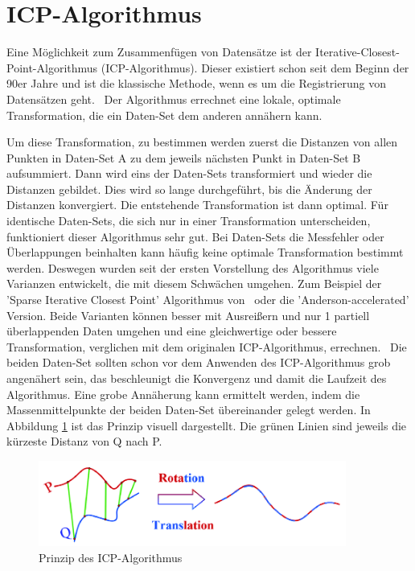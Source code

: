 \section{ICP-Algorithmus} \label{icp}

Eine Möglichkeit zum Zusammenfügen von Datensätze ist der 
Iterative-Closest-Point-Algorithmus (ICP-Algorithmus).
Dieser existiert schon seit dem Beginn der 90er Jahre und ist 
die klassische Methode, wenn es um die Registrierung von Datensätzen geht.~\cite{icp}
Der Algorithmus errechnet eine lokale, optimale Transformation, die ein Daten-Set
dem anderen annähern kann. \cite{icp_og}

Um diese Transformation, zu bestimmen werden zuerst die Distanzen von allen 
Punkten in Daten-Set A zu dem jeweils nächsten Punkt in Daten-Set B aufsummiert. 
Dann wird eins der Daten-Sets transformiert und wieder die 
Distanzen gebildet. Dies wird so lange durchgeführt,
bis die Änderung der Distanzen konvergiert. 
Die entstehende Transformation ist dann optimal.
Für identische Daten-Sets, die sich nur in einer Transformation 
unterscheiden, funktioniert dieser Algorithmus sehr gut. Bei Daten-Sets die 
Messfehler oder Überlappungen beinhalten kann häufig keine optimale 
Transformation bestimmt werden.
Deswegen wurden seit der ersten Vorstellung des Algorithmus viele Varianzen
entwickelt, die mit diesem Schwächen umgehen. 
Zum Beispiel der 'Sparse Iterative Closest Point' Algorithmus von~\cite{Bouaziz.2013}
oder die 'Anderson-accelerated' Version.
Beide Varianten können besser mit Ausreißern und nur 1
partiell überlappenden Daten umgehen und eine gleichwertige oder bessere 
Transformation, verglichen mit dem originalen ICP-Algorithmus, errechnen.\ \cite{icp}
Die beiden Daten-Set sollten schon vor dem Anwenden des ICP-Algorithmus grob angenähert sein, 
das beschleunigt die Konvergenz und damit die Laufzeit des Algorithmus.
Eine grobe Annäherung kann ermittelt werden, indem die Massenmittelpunkte der beiden Daten-Set
übereinander gelegt werden. In Abbildung \ref{fig:ipc_princip} ist das Prinzip visuell 
dargestellt. Die grünen Linien sind jeweils die kürzeste Distanz von Q nach P. 

\begin{figure}[H]
    \centering
    \includegraphics[width=0.9\textwidth]{images/Principle-of-ICP-algorithm.png}
    \caption{Prinzip des ICP-Algorithmus~\cite{icp_img}}
    \label{fig:ipc_princip}
\end{figure}

